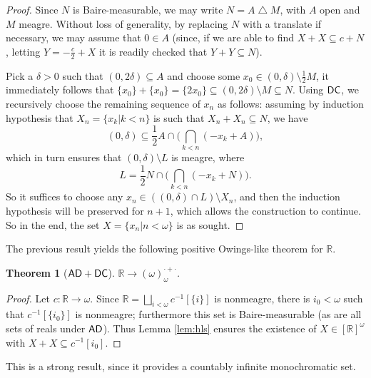 \documentclass[10pt,a4paper]{amsart}
\newtheorem{theorem}{Theorem}[section]
\theoremstyle{definition}
\newcommand{\dc}{\mathnormal{\mathsf{DC}}}
\newcommand{\ad}{\mathnormal{\mathsf{AD}}}
\theoremstyle{remark}
\numberwithin{equation}{section}
\begin{document}
    \begin{proof}
    Since $N$ is Baire-measurable, we may write $N=A\bigtriangleup M$, with $A$ open and $M$ meagre. Without loss of generality, by replacing $N$ with a translate if necessary, we may assume that $0\in A$ (since, if we are able to find $X+X\subseteq c+N$, letting $Y=-\frac{c}{2}+X$ it is readily checked that $Y+Y\subseteq N$).

    Pick a $\delta>0$ such that $(0, 2\delta)\subseteq A$ and choose some $x_{0}\in(0,\delta)\setminus\frac{1}{2}M$, it immediately follows that $\{x_{0}\}+\{x_{0}\}=\{2x_{0}\}\subseteq(0, 2\delta)\setminus M\subseteq N$. Using $\dc$, we recursively choose the remaining sequence of $x_n$ as follows: assuming by induction hypothesis that $X_n=\{x_k\big|k<n\}$ is such that $X_{n}+X_{n}\subseteq N$, we have
    \begin{equation*}
        (0,\delta)\subseteq
    \frac{1}{2}A\cap\Big(\bigcap_{k<n}(-x_{k}+A)\Big),
    \end{equation*}
    which in turn ensures that $(0,\delta)\setminus L$ is meagre, where
    \begin{equation*}
        L=\frac{1}{2}N\cap\Big(\bigcap_{k<n}(-x_{k}+N)\Big). 
    \end{equation*}
    So it suffices to choose any $x_n\in((0,\delta)\cap L)\setminus X_{n}$, and then the induction hypothesis will be preserved for $n+1$, which allows the construction to continue. So in the end, the set $X=\{x_{n}\big|n<\omega\}$ is as sought.
    \end{proof}

The previous result yields the following positive Owings-like theorem for $\mathbb R$.

\begin{theorem}[$\ad+\dc$]\label{thm:R-owings-positive}
$\mathbb{R}\to(\omega)^{\cdot+\cdot}_{\omega}$.
\end{theorem}

    \begin{proof}
        Let $c:\mathbb{R}\to\omega$. Since $\mathbb{R}=\bigsqcup_{i<\omega}c^{-1}[\{i\}]$ is nonmeagre, there is $i_0<\omega$ such that $c^{-1}[\{i_0\}]$ is nonmeagre; furthermore this set is Baire-measurable (as are all sets of reals under $\ad$). Thus Lemma \ref{lem:hls} ensures the existence of $X\in[\mathbb{R}]^{\omega}$ with $X+X\subseteq c^{-1}[{i_0}]$.
    \end{proof}

This is a strong result, since it provides a countably infinite monochromatic set.
\end{document}

